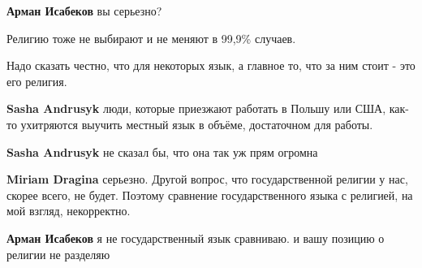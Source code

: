 \begin{itemize}
\begin{itemize}
\textbf{Арман Исабеков} вы серьезно?

 
Религию тоже не выбирают и не меняют в 99,9\% случаев.

Надо сказать честно, что для некоторых язык, а главное то, что за ним стоит - это его религия.


 
\textbf{Sasha Andrusyk} люди, которые приезжают работать в Польшу или США, как-то ухитряются выучить местный язык в объёме, достаточном для работы.

 
\textbf{Sasha Andrusyk} не сказал бы, что она так уж прям огромна

 
\textbf{Miriam Dragina} серьезно. Другой вопрос, что государственной религии у нас, скорее всего, не будет. Поэтому сравнение государственного языка с религией, на мой взгляд, некорректно.

 
\textbf{Арман Исабеков} я не государственный язык сравниваю. и вашу позицию о религии не разделяю

 

\end{itemize}
\end{itemize}
